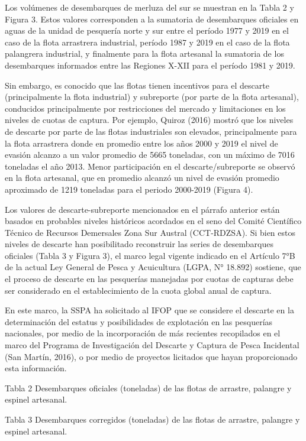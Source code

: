 \documentclass[
  spanish,
]{article}
\begin{document}
Los volúmenes de desembarques de merluza del sur se muestran en la Tabla
2 y Figura 3. Estos valores corresponden a la sumatoria de desembarques
oficiales en aguas de la unidad de pesquería norte y sur entre el
período 1977 y 2019 en el caso de la flota arrastrera industrial,
período 1987 y 2019 en el caso de la flota palangrera industrial, y
finalmente para la flota artesanal la sumatoria de los desembarques
informados entre las Regiones X-XII para el período 1981 y 2019.

Sin embargo, es conocido que las flotas tienen incentivos para el
descarte (principalmente la flota industrial) y subreporte (por parte de
la flota artesanal), conducidos principalmente por restricciones del
mercado y limitaciones en los niveles de cuotas de captura. Por ejemplo,
Quiroz (2016) mostró que los niveles de descarte por parte de las flotas
industriales son elevados, principalmente para la flota arrastrera donde
en promedio entre los años 2000 y 2019 el nivel de evasión alcanzo a un
valor promedio de 5665 toneladas, con un máximo de 7016 toneladas el año
2013. Menor participación en el descarte/subreporte se observó en la
flota artesanal, que en promedio alcanzó un nivel de evasión promedio
aproximado de 1219 toneladas para el periodo 2000-2019 (Figura 4).

Los valores de descarte-subreporte mencionados en el párrafo anterior
están basados en probables niveles históricos acordados en el seno del
Comité Científico Técnico de Recursos Demersales Zona Sur Austral
(CCT-RDZSA). Si bien estos niveles de descarte han posibilitado
reconstruir las series de desembarques oficiales (Tabla 3 y Figura 3),
el marco legal vigente indicado en el Artículo 7°B de la actual Ley
General de Pesca y Acuicultura (LGPA, N° 18.892) sostiene, que el
proceso de descarte en las pesquerías manejadas por cuotas de capturas
debe ser considerado en el establecimiento de la cuota global anual de
captura.

En este marco, la SSPA ha solicitado al IFOP que se considere el
descarte en la determinación del estatus y posibilidades de explotación
en las pesquerías nacionales, por medio de la incorporación de más
recientes recopilados en el marco del Programa de Investigación del
Descarte y Captura de Pesca Incidental (San Martín, 2016), o por medio
de proyectos licitados que hayan proporcionado esta información.

Tabla 2 Desembarques oficiales (toneladas) de las flotas de arrastre,
palangre y espinel artesanal.

Tabla 3 Desembarques corregidos (toneladas) de las flotas de arrastre,
palangre y espinel artesanal.
\end{document}

